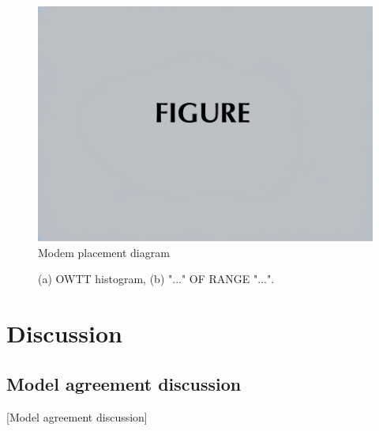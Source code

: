 \begin{figure}[ht]
\includegraphics[width=\reprintcolumnwidth]{figsamp.jpg}
\caption{\label{fig:FIG3}{Modem placement diagram}}
\end{figure}

\begin{figure}[ht]
\caption{\label{fig:FIG4}{(a) OWTT histogram, (b) "..." OF RANGE "...".}}
\end{figure}



\section{\label{sec:4} Discussion}

\subsection{\label{subsec:4:1} Model agreement discussion}
{\color{red}[Model agreement discussion]}

